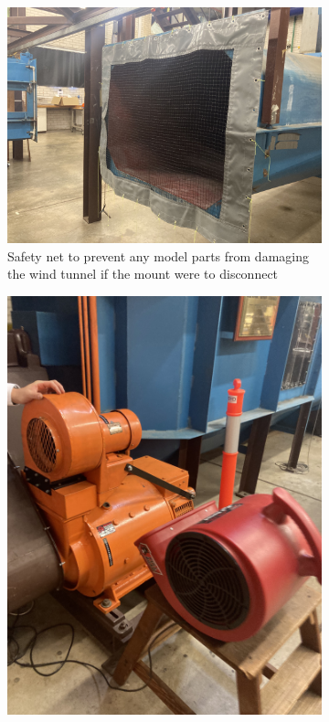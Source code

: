 \begin{figure}[H]
     \centering
     \begin{subfigure}[b]{0.45\textwidth}
             \centering
            \includegraphics[scale =0.05]{04_Methodology/Figs/windTunnelNet.jpg}
            \caption{Safety net to prevent any model parts from damaging the wind tunnel if the mount were to disconnect}
            \label{fig:windTunnelNet}
     \end{subfigure}
     \hfill
     \begin{subfigure}[b]{0.45\textwidth}
                \centering
                \includegraphics[scale=0.05]{04_Methodology/Figs/cooler.jpg}

\end{subfigure}
\end{figure}

